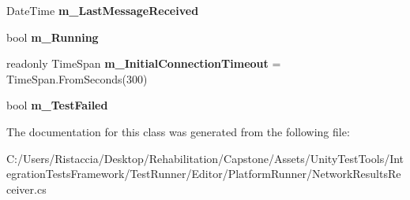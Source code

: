 \begin{DoxyCompactItemize}
Date\+Time {\bfseries m\+\_\+\+Last\+Message\+Received}
\item 
\mbox{\label{class_unity_test_1_1_network_results_receiver_a140faa85683a501d94144eef0c39c880}} 
bool {\bfseries m\+\_\+\+Running}
\item 
\mbox{\label{class_unity_test_1_1_network_results_receiver_af14ef9e525362f32203b2c869b1ee2e0}} 
readonly Time\+Span {\bfseries m\+\_\+\+Initial\+Connection\+Timeout} = Time\+Span.\+From\+Seconds(300)
\item 
\mbox{\label{class_unity_test_1_1_network_results_receiver_a8aade87685fb3bd0942f14066d92c08c}} 
bool {\bfseries m\+\_\+\+Test\+Failed}
\end{DoxyCompactItemize}


The documentation for this class was generated from the following file\+:\begin{DoxyCompactItemize}
\item 
C\+:/\+Users/\+Ristaccia/\+Desktop/\+Rehabilitation/\+Capstone/\+Assets/\+Unity\+Test\+Tools/\+Integration\+Tests\+Framework/\+Test\+Runner/\+Editor/\+Platform\+Runner/Network\+Results\+Receiver.\+cs\end{DoxyCompactItemize}
